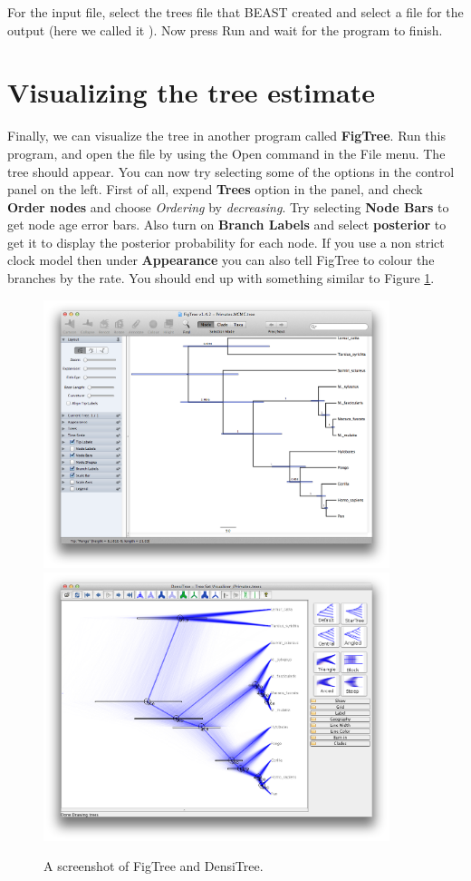 \documentclass[11pt]{article}
\theoremstyle{plain}%
\theoremstyle{definition}
\theoremstyle{remark}
\begin{document}
For the input file, select the trees file that BEAST created and select a file for the
output (here we called it \mccTree{}). Now press Run and wait for the program to finish.

\section{Visualizing the tree estimate}

Finally, we can visualize the tree in another program called {\bf FigTree}. Run this program, and open
the \mccTree{} file by using the Open command in the File menu. The tree should appear.
You can now try selecting some of the options in the control panel on the left. 
First of all, expend {\bf Trees} option in the panel, and check {\bf Order nodes} and choose \textit{Ordering} by \textit{decreasing}. 
Try selecting {\bf Node Bars} to get node age error bars. Also turn on {\bf Branch Labels} and select {\bf posterior} to get
it to display the posterior probability for each node. 
If you use a non strict clock model then under {\bf Appearance} you can also tell FigTree to colour the branches by the rate.
You should end up with something similar to Figure \ref{fig:FigTree}.

\begin{figure}
\centering	
\includegraphics[width=0.9\textwidth]{figures/FigTree}
\includegraphics[width=0.9\textwidth]{figures/DensiTree}
\caption{A screenshot of FigTree and DensiTree.}
\label{fig:FigTree}
\end{figure}
\end{document}
